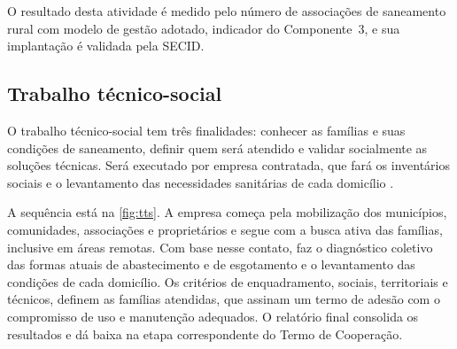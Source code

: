 O resultado desta atividade é medido pelo número de associações de saneamento
rural com modelo de gestão adotado, indicador do Componente~3, e sua
implantação é validada pela SECID.


\FloatBarrier
\subsection{Trabalho técnico-social}
\label{subsec:tts}

O trabalho técnico-social tem três finalidades: conhecer as famílias e suas
condições de saneamento, definir quem será atendido e validar socialmente as
soluções técnicas. Será executado por empresa contratada, que fará os
inventários sociais e o levantamento das necessidades sanitárias de cada
domicílio \cite{mop2026}.

A sequência está na \autoref{fig:tts}. A empresa começa pela mobilização dos
municípios, comunidades, associações e proprietários e segue com a busca ativa
das famílias, inclusive em áreas remotas. Com base nesse contato, faz o
diagnóstico coletivo das formas atuais de abastecimento e de esgotamento e o
levantamento das condições de cada domicílio. Os critérios de enquadramento,
sociais, territoriais e técnicos, definem as famílias atendidas, que assinam um
termo de adesão com o compromisso de uso e manutenção adequados. O relatório
final consolida os resultados e dá baixa na etapa correspondente do Termo de
Cooperação.

